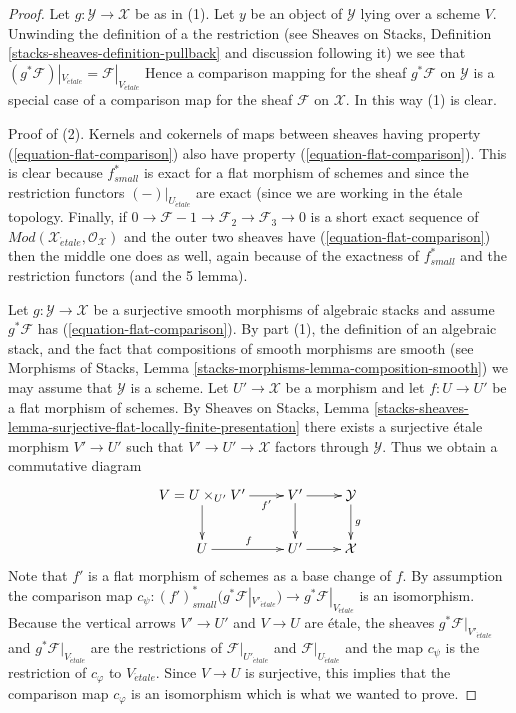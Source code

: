\begin{proof}
Let $g : \mathcal{Y} \to \mathcal{X}$ be as in (1).
Let $y$ be an object of $\mathcal{Y}$ lying over a scheme $V$. Unwinding
the definition of a the restriction (see
Sheaves on Stacks, Definition \ref{stacks-sheaves-definition-pullback}
and discussion following it) we see that
$(g^*\mathcal{F})|_{V_{\acute{e}tale}} = \mathcal{F}|_{V_{\acute{e}tale}}$
Hence a comparison mapping for the sheaf $g^*\mathcal{F}$ on $\mathcal{Y}$
is a special case of a comparison map for the sheaf $\mathcal{F}$ on
$\mathcal{X}$. In this way (1) is clear.

\medskip\noindent
Proof of (2). Kernels and cokernels of
maps between sheaves having property (\ref{equation-flat-comparison})
also have property (\ref{equation-flat-comparison}). This is clear because
$f_{small}^*$ is exact for a flat morphism of schemes and since the restriction
functors $(-)|_{U_{\acute{e}tale}}$ are exact (since we are working in
the \'etale topology. Finally, if $0 \to \mathcal{F}-1 \to \mathcal{F}_2
\to \mathcal{F}_3 \to 0$ is a short exact sequence of
$\textit{Mod}(\mathcal{X}_{\acute{e}tale}, \mathcal{O}_\mathcal{X})$
and the outer two sheaves have (\ref{equation-flat-comparison}) then
the middle one does as well, again because of the exactness of
$f_{small}^*$ and the restriction functors (and the 5 lemma).

\medskip\noindent
Let $g : \mathcal{Y} \to \mathcal{X}$ be a surjective smooth
morphisms of algebraic stacks and assume $g^*\mathcal{F}$
has (\ref{equation-flat-comparison}). By part (1), the definition of
an algebraic stack, and the fact that compositions of smooth morphisms
are smooth (see
Morphisms of Stacks, Lemma \ref{stacks-morphisms-lemma-composition-smooth})
we may assume that $\mathcal{Y}$ is a scheme. Let $U' \to \mathcal{X}$
be a morphism and let $f : U \to U'$ be a flat morphism of schemes.
By Sheaves on Stacks, Lemma
\ref{stacks-sheaves-lemma-surjective-flat-locally-finite-presentation}
there exists a surjective \'etale morphism $V' \to U'$ such that
$V' \to U' \to \mathcal{X}$ factors through $\mathcal{Y}$.
Thus we obtain a commutative diagram
$$
\xymatrix{
V = U \times_{U'} V' \ar[r]_-{f'} \ar[d] &
V' \ar[r] \ar[d] & \mathcal{Y} \ar[d]^g \\
U \ar[r]^f & U' \ar[r] & \mathcal{X}
}
$$
Note that $f'$ is a flat morphism of schemes as a base change of $f$.
By assumption the comparison map
$c_\psi : (f')_{small}^*\big(g^*\mathcal{F}|_{V'_{\acute{e}tale}}\big)
\to g^*\mathcal{F}|_{V_{\acute{e}tale}}$ is an isomorphism.
Because the vertical arrows $V' \to U'$ and $V \to U$ are \'etale,
the sheaves $g^*\mathcal{F}|_{V'_{\acute{e}tale}}$ and
$g^*\mathcal{F}|_{V_{\acute{e}tale}}$ are the restrictions of
$\mathcal{F}|_{U'_{\acute{e}tale}}$ and $\mathcal{F}|_{U_{\acute{e}tale}}$
and the map $c_\psi$ is the restriction of $c_\varphi$ to
$V_{\acute{e}tale}$. Since $V \to U$ is surjective, this implies
that the comparison map $c_\varphi$ is an isomorphism which is what
we wanted to prove.
\end{proof}

